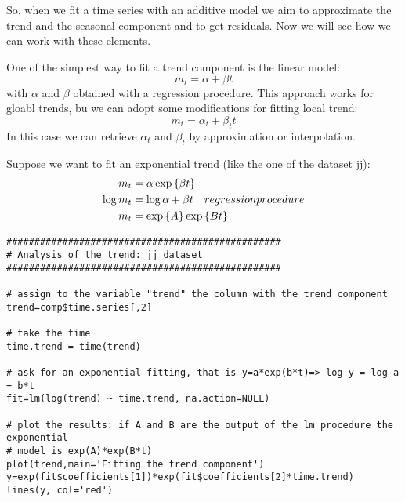 So, when we fit a time series with an additive model we aim to approximate the trend and the seasonal component and to get residuals. Now we will see how we can work with these elements.

One of the simplest way to fit a trend component is the linear model:
\[
    m_t=\alpha+\beta t  
\]
with $\alpha$ and $\beta$ obtained with a regression procedure. This approach works for gloabl trends, bu we can adopt some modifications for fitting local trend:
\[
    m_t=\alpha_t+\beta_t t  
\]
In this case we can retrieve $\alpha_t$ and $\beta_t$ by approximation or interpolation.

\begin{example}
    Suppose we want to fit an exponential trend (like the one of the dataset jj):
    \begin{equation*}
        \begin{split}
            m_t&=\alpha\exp\left\{\beta t\right\}\\
            \log m_t&=\log \alpha+\beta t\ \ \ regression procedure\\
            m_t&=\exp\left\{A\right\}\exp\left\{Bt\right\}
        \end{split}
    \end{equation*}
\end{example}

\begin{example}
    \begin{verbatim}
#################################################
# Analysis of the trend: jj dataset
#################################################

# assign to the variable "trend" the column with the trend component 
trend=comp$time.series[,2]

# take the time
time.trend = time(trend)

# ask for an exponential fitting, that is y=a*exp(b*t)=> log y = log a + b*t
fit=lm(log(trend) ~ time.trend, na.action=NULL)

# plot the results: if A and B are the output of the lm procedure the exponential
# model is exp(A)*exp(B*t)
plot(trend,main='Fitting the trend component')
y=exp(fit$coefficients[1])*exp(fit$coefficients[2]*time.trend)
lines(y, col='red')
    \end{verbatim}
\end{example}

